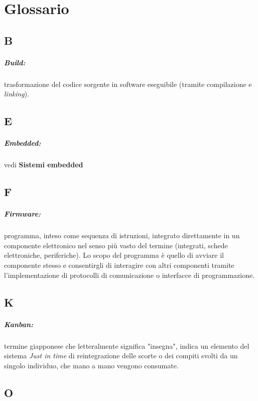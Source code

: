 \chapter*{Glossario}
\nocite{*}
\section*{B}
\paragraph{Build: } trasformazione del codice sorgente in software eseguibile (tramite compilazione e \textit{linking}).

\section*{E}
\paragraph{Embedded:} vedi \textbf{Sistemi embedded}

 \section*{F}
\paragraph*{Firmware:}  programma, inteso come sequenza di istruzioni, integrato direttamente in un componente elettronico nel senso più vasto del termine (integrati, schede elettroniche, periferiche). Lo scopo del programma è quello di avviare il componente stesso e consentirgli di interagire con altri componenti tramite l'implementazione di protocolli di comunicazione o interfacce di programmazione.

\section*{K}
\paragraph*{Kanban: } termine giapponese che letteralmente significa "insegna", indica un elemento del sistema \textit{Just in time} di reintegrazione delle scorte o dei compiti svolti da un singolo individuo, che mano a mano vengono consumate.

\section*{O}
